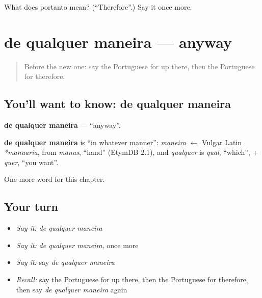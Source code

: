 \begin{tcolorbox}[breakable,colback=teal!4,colframe=teal!35!black,title={Before you move on}]
What does portanto mean? (\textquotedblleft{}Therefore\textquotedblright{}.) Say it once more.
\end{tcolorbox}
\section[de qualquer maneira]{de qualquer maneira — anyway}

\label{lesson:PT-C152-de-qualquer-maneira}



\begin{quote}
Before the new one: say the Portuguese for up there, then the Portuguese for therefore.
\end{quote}

\subsection*{You'll want to know: de qualquer maneira}
\textbf{de qualquer maneira} — \textquotedblleft{}anyway\textquotedblright{}.

\begin{cousinweb}
\textbf{de qualquer maneira} is \textquotedblleft{}in whatever manner\textquotedblright{}: \emph{maneira} $\leftarrow$ Vulgar Latin \emph{*manuaria}, from \emph{manus}, \textquotedblleft{}hand\textquotedblright{} (EtymDB 2.1), and \emph{qualquer} is \emph{qual}, \textquotedblleft{}which\textquotedblright{}, + \emph{quer}, \textquotedblleft{}you want\textquotedblright{}.
\end{cousinweb}

\begin{grammarlens}[title={What you've built}]
One more word for this chapter.
\end{grammarlens}

\subsection*{Your turn}
\begin{itemize}
\raggedright
  \item \emph{Say it:} \emph{de qualquer maneira}
  \item \emph{Say it:} \emph{de qualquer maneira}, once more
  \item \emph{Say it:} say \emph{de qualquer maneira}
  \item \emph{Recall:} say the Portuguese for up there, then the Portuguese for therefore, then say \emph{de qualquer maneira} again
\end{itemize}

